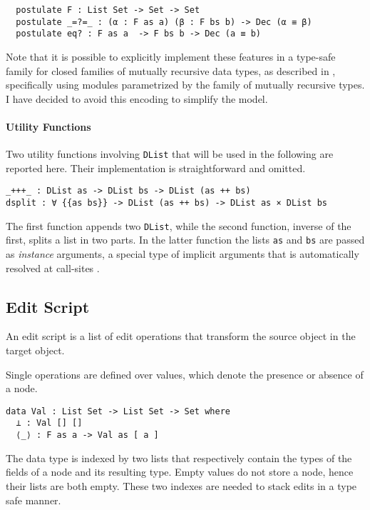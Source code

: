\documentclass[../Thesis.tex]{subfiles}
\begin{document}
		
\begin{verbatim}
  postulate F : List Set -> Set -> Set 
  postulate _=?=_ : (α : F as a) (β : F bs b) -> Dec (α ≡ β)
  postulate eq? : F as a  -> F bs b -> Dec (a ≡ b)
\end{verbatim}

	Note that it is possible to explicitly implement these features in a 
	type-safe family for closed families of mutually recursive data types, 
	as described in \cite{Lemp09}, specifically using modules parametrized
	by the family of mutually recursive types. 
	I have decided to avoid this encoding to simplify the model.
		
	\paragraph{Utility Functions}
	\label{par:UtilityFun}
	Two utility functions involving \texttt{DList} that will be used in the 
	following are reported here.
	Their implementation is straightforward and omitted.

\begin{verbatim}
_+++_ : DList as -> DList bs -> DList (as ++ bs)
dsplit : ∀ {{as bs}} -> DList (as ++ bs) -> DList as × DList bs
\end{verbatim}
	
	The first function appends two \texttt{DList}, while the second function,
	inverse of the first, splits a list in two parts.
	In the latter function the lists \texttt{as} and \texttt{bs} are passed
	as \emph{instance} arguments, a special type of implicit arguments 
	that is automatically resolved at call-sites \cite{Devriese11}.
		 
	\subsection{Edit Script}
	\label{subsec:EditScript}
	An edit script is a list of edit operations that transform the source object in
	the target object.

	Single operations are defined over values, which denote the
	presence or absence of a node. 
			
\begin{verbatim}
data Val : List Set -> List Set -> Set where
  ⊥ : Val [] []
  ⟨_⟩ : F as a -> Val as [ a ] 
\end{verbatim}
	The data type is indexed by two lists that respectively contain
	 the types of the fields	of a node and its resulting type.
	 Empty values do not store a node, hence their lists are both empty.
	 These two indexes are needed to stack edits in a type safe
	 manner.
	
\end{document}
